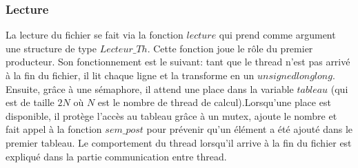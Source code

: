 \documentclass{article}
\begin{document}
\subsubsection{Lecture}
La lecture du fichier se fait via la fonction $lecture$ qui prend comme argument une structure de type $Lecteur\_Th$. Cette fonction joue le rôle du premier producteur. Son fonctionnement est le suivant: tant que le thread n'est pas arrivé à la fin du fichier, il lit chaque ligne et la transforme en un $unsigned long long$. Ensuite, grâce à une sémaphore, il attend une place dans la variable $tableau$ (qui est de taille $2N$ où $N$ est le nombre de thread de calcul).Lorsqu'une place est disponible, il protège l'accès au tableau grâce à un mutex, ajoute le nombre et fait appel à la fonction $sem\_post$ pour prévenir qu'un élément a été ajouté dans le premier tableau.
Le comportement du thread lorsqu'il arrive à la fin du fichier est expliqué dans la partie communication entre thread.



\end{document}
